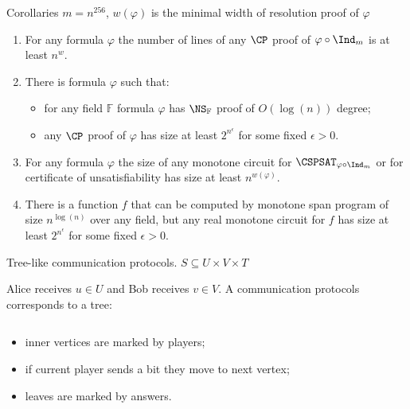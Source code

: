 \begin{frame}{Corollaries}
    $m = n^{256}$, $w(\varphi)$ is the minimal width of resolution proof of $\varphi$

    \pause
    \begin{enumerate}
        \item For any formula $\varphi$ the number of lines of any $\CP$ proof of $\varphi \circ \Ind_m$
            is at least $n^{w}$.
        \pause
        \item There is formula $\varphi$ such that:
            \begin{itemize}
                \item for any field $\mathbb{F}$ formula $\varphi$ has $\NS_{\mathbb{F}}$ proof of
                    $O(\log(n))$ degree;
                \item any $\CP$ proof of $\varphi$ has size at least $2^{n^{\epsilon}}$ for some fixed
                    $\epsilon > 0$.
            \end{itemize}
        \pause
        \item For any formula $\varphi$ the size of any monotone circuit for $\CSPSAT_{\varphi \circ
            \Ind_m}$ or for certificate of unsatisfiability has size at least $n^{w(\varphi)}$.
        \pause
        \item There is a function $f$ that can be computed by monotone span program of size $n^{\log(n)}$
            over any field, but any real monotone circuit for $f$ has size at least $2^{n^{\epsilon}}$
            for some fixed $\epsilon > 0$.
    \end{enumerate}
\end{frame}


\begin{frame}{Tree-like communication protocols. $S \subseteq U \times V \times T$}

    Alice receives $u \in U$ and Bob receives $v \in V$. A communication protocols corresponds to a tree:

    \begin{columns}[t]
		\begin{column}{0.7\textwidth}
            \begin{itemize}
                \item<2-> inner vertices are marked by players;
	            \item<3-> if current player sends a bit they move to next vertex;
    		    \item<8-> leaves are marked by answers.
	        \end{itemize}

            \vspace{0.5cm}
        \end{column}
        
		\begin{column}{0.25\textwidth}
            
		\end{column}
	\end{columns}

\end{frame}


